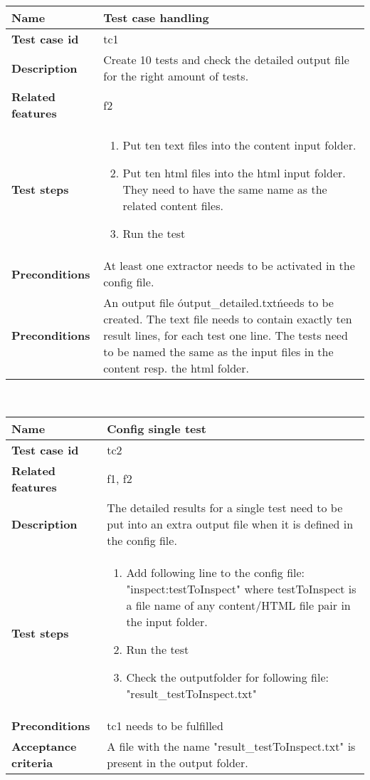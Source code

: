	\begin{tabular}{ | p{3.5cm} | p{12cm} |}
	\hline
	\textbf{Name} 					& Test case handling 	\\ 	\hline
	\textbf{Test case id} 			& tc1 					\\ 	\hline
	\textbf{Description} 			& Create 10 tests and check the detailed output file for the right amount of tests. 	\\ 	\hline
	\textbf{Related features}		& f2		\\ 	\hline
	\textbf{Test steps} 			& 	\begin{enumerate}
											\item{Put ten text files into the content input folder.}
											\item{Put ten html files into the html input folder. They need to have the same name as the related content files.}
											\item{Run the test}
										\end{enumerate}
										\\ 	\hline
	\textbf{Preconditions} 			& At least one extractor needs to be activated in the config file.	\\ 	\hline
	\textbf{Preconditions} 			& An output file \'output\_detailed.txt\' needs to be created. The text file needs to contain exactly ten result lines, for each 											test one line. The tests need to be named the same as the input files in the content resp. the html folder.	\\ 	\hline
	\end{tabular} \\


	\begin{tabular}{ | p{3.5cm} | p{12cm} |}
	\hline
	\textbf{Name} 					& Config single test		\\ 	\hline
	\textbf{Test case id} 			& tc2 						\\ 	\hline
	\textbf{Related features}		& f1, f2						\\ 	\hline
	\textbf{Description} 			& The detailed results for a single test need to be put into an extra output file when it is defined in the config file. \\ 	\hline
	\textbf{Test steps} 			& 	\begin{enumerate}
											\item{Add following line to the config file: "inspect:testToInspect" where testToInspect is a file name of any content/HTML file pair in the input folder. }
											\item{Run the test}
											\item{Check the outputfolder for following file: "result\_testToInspect.txt"}
										\end{enumerate}
																\\ 	\hline
	\textbf{Preconditions} 			& tc1 needs to be fulfilled							\\ 	\hline
	\textbf{Acceptance criteria} 	& A file with the name "result\_testToInspect.txt" is present in the output folder. \\ 	\hline
	\end{tabular} \\


